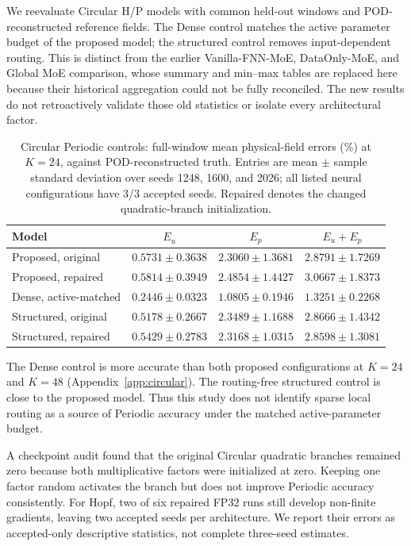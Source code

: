 \documentclass{article}
\begin{document}
We reevaluate Circular H/P models with common held-out windows and
POD-reconstructed reference fields. The Dense control matches the active
parameter budget of the proposed model; the structured control removes
input-dependent routing. This is distinct from the earlier
Vanilla-FNN-MoE, DataOnly-MoE, and Global MoE comparison, whose summary and
min--max tables are replaced here because their historical aggregation
could not be fully reconciled. The new results do not retroactively
validate those old statistics or isolate every architectural factor.

\begin{table}[H]
\centering
\caption{Circular Periodic controls: full-window mean physical-field
errors (\%) at $K=24$, against POD-reconstructed truth. Entries are mean
$\pm$ sample standard deviation over seeds 1248, 1600, and 2026; all
listed neural configurations have 3/3 accepted seeds. Repaired denotes
the changed quadratic-branch initialization.}
\label{tab:circular_full_reorg}
\small
\setlength{\tabcolsep}{4pt}
\begin{tabular}{@{}lccc@{}}
\toprule
Model & $E_u$ & $E_p$ & $E_u+E_p$\\
\midrule
Proposed, original & $0.5731\pm0.3638$ & $2.3060\pm1.3681$ & $2.8791\pm1.7269$\\
Proposed, repaired & $0.5814\pm0.3949$ & $2.4854\pm1.4427$ & $3.0667\pm1.8373$\\
Dense, active-matched & $\mathbf{0.2446\pm0.0323}$ & $\mathbf{1.0805\pm0.1946}$ & $\mathbf{1.3251\pm0.2268}$\\
Structured, original & $0.5178\pm0.2667$ & $2.3489\pm1.1688$ & $2.8666\pm1.4342$\\
Structured, repaired & $0.5429\pm0.2783$ & $2.3168\pm1.0315$ & $2.8598\pm1.3081$\\
\bottomrule
\end{tabular}
\end{table}

The Dense control is more accurate than both proposed configurations at
$K=24$ and $K=48$ (Appendix~\ref{app:circular}). The routing-free
structured control is close to the proposed model. Thus this study does
not identify sparse local routing as a source of Periodic accuracy under
the matched active-parameter budget.

A checkpoint audit found that the original Circular quadratic branches
remained zero because both multiplicative factors were initialized at
zero. Keeping one factor random activates the branch but does not improve
Periodic accuracy consistently. For Hopf, two of six repaired FP32 runs
still develop non-finite gradients, leaving two accepted seeds per
architecture. We report their errors as accepted-only descriptive
statistics, not complete three-seed estimates.
\end{document}
